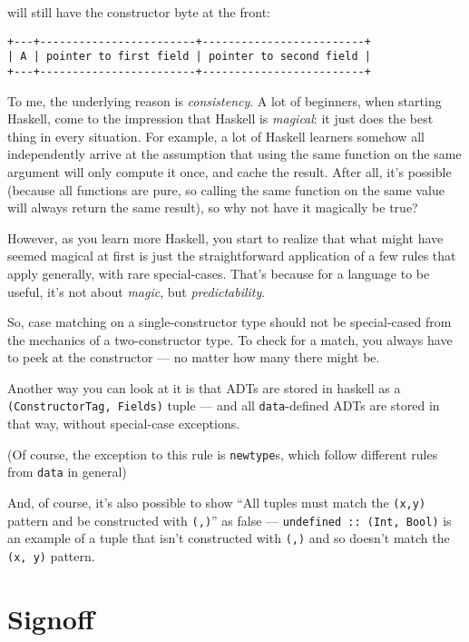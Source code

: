 \documentclass[]{article}
\begin{document}
\begin{enumerate}
  will still have the constructor byte at the front:

\begin{verbatim}
+---+------------------------+-------------------------+
| A | pointer to first field | pointer to second field |
+---+------------------------+-------------------------+
\end{verbatim}
\end{enumerate}

To me, the underlying reason is \emph{consistency}. A lot of beginners, when
starting Haskell, come to the impression that Haskell is \emph{magical}: it just
does the best thing in every situation. For example, a lot of Haskell learners
somehow all independently arrive at the assumption that using the same function
on the same argument will only compute it once, and cache the result. After all,
it's possible (because all functions are pure, so calling the same function on
the same value will always return the same result), so why not have it magically
be true?

However, as you learn more Haskell, you start to realize that what might have
seemed magical at first is just the straightforward application of a few rules
that apply generally, with rare special-cases. That's because for a language to
be useful, it's not about \emph{magic}, but \emph{predictability}.

So, case matching on a single-constructor type should not be special-cased from
the mechanics of a two-constructor type. To check for a match, you always have
to peek at the constructor --- no matter how many there might be.

Another way you can look at it is that ADTs are stored in haskell as a
\texttt{(ConstructorTag,\ Fields)} tuple --- and all \texttt{data}-defined ADTs
are stored in that way, without special-case exceptions.

(Of course, the exception to this rule is \texttt{newtype}s, which follow
different rules from \texttt{data} in general)

And, of course, it's also possible to show ``All tuples must match the
\texttt{(x,y)} pattern and be constructed with \texttt{(,)}'' as false ---
\texttt{undefined\ ::\ (Int,\ Bool)} is an example of a tuple that isn't
constructed with \texttt{(,)} and so doesn't match the \texttt{(x,\ y)} pattern.

\hypertarget{signoff}{%
\section{Signoff}\label{signoff}}
\end{document}
